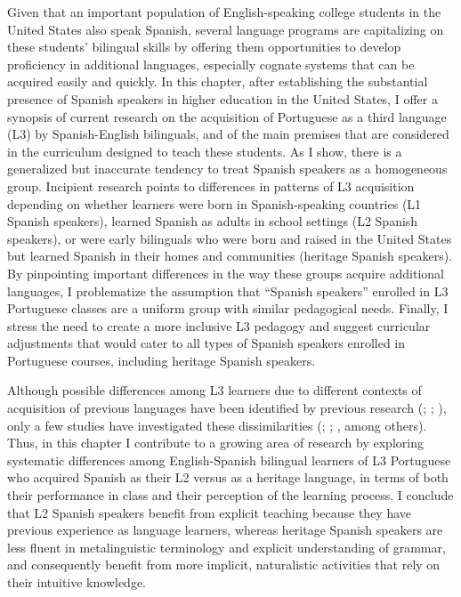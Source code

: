 \documentclass[output=paper]{../langscibook}
\begin{document}
Given that an important population of English-speaking college students in the United States also speak Spanish, several language programs are capitalizing on these students’ bilingual skills by offering them opportunities to develop proficiency in additional languages, especially cognate systems that can be acquired easily and quickly. In this chapter, after establishing the substantial presence of Spanish speakers in higher education in the United States, I offer a synopsis of current research on the acquisition of Portuguese as a third language (L3) by Spanish-English bilinguals, and of the main premises that are considered in the curriculum designed to teach these students. As I show, there is a generalized but inaccurate tendency to treat Spanish speakers as a homogeneous group. Incipient research points to differences in patterns of L3 acquisition depending on whether learners were born in Spanish-speaking countries (L1 Spanish speakers), learned Spanish as adults in school settings (L2 Spanish speakers), or were early bilinguals who were born and raised in the United States but learned Spanish in their homes and communities (heritage Spanish speakers). By pinpointing important differences in the way these groups acquire additional languages, I problematize the assumption that “Spanish speakers” enrolled in L3 Portuguese classes are a uniform group with similar pedagogical needs. Finally, I stress the need to create a more inclusive L3 pedagogy and suggest curricular adjustments that would cater to all types of Spanish speakers enrolled in Portuguese courses, including heritage Spanish speakers.

Although possible differences among L3 learners due to different contexts of acquisition of previous languages have been identified by previous research (\citealt{Carvalho2002}; \citealt{Cenoz2011}; \citealt{Johnson2004}), only a few studies have investigated these dissimilarities (\citealt{CarvalhoChild2018}; \citealt{CarvalhoSilva2006}; \citealt{Child2014}, among others). Thus, in this chapter I contribute to a growing area of research by exploring systematic differences among English-Spanish bilingual learners of L3 Portuguese who acquired Spanish as their L2 versus as a heritage language, in terms of both their performance in class and their perception of the learning process. I conclude that L2 Spanish speakers benefit from explicit teaching because they have previous experience as language learners, whereas heritage Spanish speakers are less fluent in metalinguistic terminology and explicit understanding of grammar, and consequently benefit from more implicit, naturalistic activities that rely on their intuitive knowledge.
\end{document}
